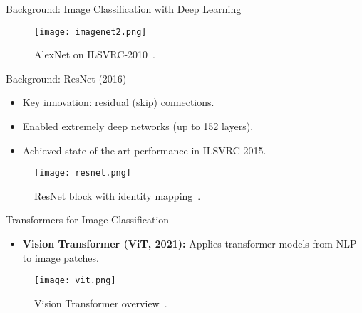 \begin{refsection}
  \begin{frame}{Background: Image Classification with Deep Learning}
    \begin{figure}
      \centering
      \texttt{[image: imagenet2.png]}
      \caption[]{\scriptsize AlexNet on ILSVRC-2010~\parencite{imagenet2010challenge}.}
    \end{figure}
    \bottomleftrefs
  \end{frame}
\end{refsection}

\begin{frame}{Background: ResNet (2016)}
  \begin{itemize}
    \item Key innovation: residual (skip) connections.
    \item Enabled extremely deep networks (up to 152 layers).
    \item Achieved state-of-the-art performance in ILSVRC-2015.
  \end{itemize}
  \begin{figure}
    \centering
    \texttt{[image: resnet.png]}
    \caption{\scriptsize ResNet block with identity mapping~\parencite{heDeepResidualLearning2016}.}
  \end{figure}
\end{frame}

\begin{frame}{Transformers for Image Classification}
  \begin{itemize}
    \item \textbf{Vision Transformer (ViT, 2021):} Applies transformer models from NLP to image patches.
  \end{itemize}
  \begin{figure}
    \centering
    \texttt{[image: vit.png]}
    \caption{\scriptsize Vision Transformer overview~\parencite{dosovitskiyImageWorth16x162020}.}
  \end{figure}
\end{frame}


